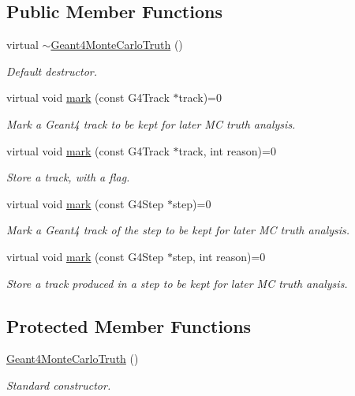 \subsection*{Public Member Functions}
\begin{DoxyCompactItemize}
\item 
virtual \hyperlink{class_d_d4hep_1_1_simulation_1_1_geant4_monte_carlo_truth_acc1f5693c904777e8470b7df290d1c2c}{$\sim$\+Geant4\+Monte\+Carlo\+Truth} ()
\begin{DoxyCompactList}\small\item\em Default destructor. \end{DoxyCompactList}\item 
virtual void \hyperlink{class_d_d4hep_1_1_simulation_1_1_geant4_monte_carlo_truth_ad74253c38fb6e00003b591a07e5e748d}{mark} (const G4\+Track $\ast$track)=0
\begin{DoxyCompactList}\small\item\em Mark a Geant4 track to be kept for later MC truth analysis. \end{DoxyCompactList}\item 
virtual void \hyperlink{class_d_d4hep_1_1_simulation_1_1_geant4_monte_carlo_truth_a6b63ab3d0ac424aba1088fb9ea2994dc}{mark} (const G4\+Track $\ast$track, int reason)=0
\begin{DoxyCompactList}\small\item\em Store a track, with a flag. \end{DoxyCompactList}\item 
virtual void \hyperlink{class_d_d4hep_1_1_simulation_1_1_geant4_monte_carlo_truth_a6aa3674a7c9e2f0132251bf05c7dab88}{mark} (const G4\+Step $\ast$step)=0
\begin{DoxyCompactList}\small\item\em Mark a Geant4 track of the step to be kept for later MC truth analysis. \end{DoxyCompactList}\item 
virtual void \hyperlink{class_d_d4hep_1_1_simulation_1_1_geant4_monte_carlo_truth_aaa3fb07338363616c0a898d791d24314}{mark} (const G4\+Step $\ast$step, int reason)=0
\begin{DoxyCompactList}\small\item\em Store a track produced in a step to be kept for later MC truth analysis. \end{DoxyCompactList}\end{DoxyCompactItemize}
\subsection*{Protected Member Functions}
\begin{DoxyCompactItemize}
\item 
\hyperlink{class_d_d4hep_1_1_simulation_1_1_geant4_monte_carlo_truth_a2b9a9965ca3752b2f4e1a9e267f3c4cc}{Geant4\+Monte\+Carlo\+Truth} ()
\begin{DoxyCompactList}\small\item\em Standard constructor. \end{DoxyCompactList}\end{DoxyCompactItemize}



